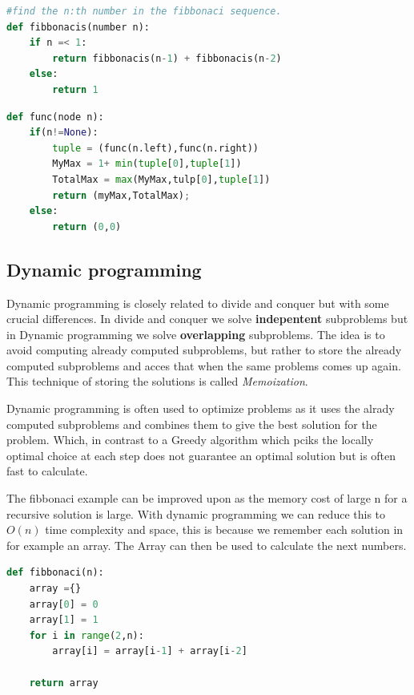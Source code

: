 \documentclass[12pt]{article} %
\begin{document}
\begin{lstlisting}[language=Python, caption=Fibbonaci in Python]
#find the n:th number in the fibbonaci sequence.
def fibbonacis(number n):
    if n =< 1:
        return fibbonacis(n-1) + fibbonacis(n-2)
    else:
        return 1
\end{lstlisting}
\begin{lstlisting}[language=Python, caption=Perfect subtree in BST]
def func(node n):
    if(n!=None):
        tuple = (func(n.left),func(n.right))
        MyMax = 1+ min(tuple[0],tuple[1])
        TotalMax = max(MyMax,tulp[0],tuple[1])
        return (myMax,TotalMax);
    else:
        return (0,0)
\end{lstlisting}

\subsection{Dynamic programming} %
Dynamic programming is closely related to divide and conquer but with some crucial differences. In divide and conquer we solve \textbf{indepentent} subproblems but in Dynamic programming we solve \textbf{overlapping} subproblems. The idea is to avoid computing already computed subproblems, but rather to store the already computed subproblems and acces that when the same problems comes up again. This technique of storing the solutions is called \textit{Memoization}.

\par Dynamic programming is often used to optimize problems as it uses the alrady computed subproblems and combines them to give the best solution for the problem. Which, in contrast to a Greedy algorithm which pciks the locally optimal choice at each step does not guarantee an optimal solution but is often fast to calculate.

\par The fibbonaci example can be improved upon as the memory cost of large n for a recursive solution is large. With dynamic programming we can reduce this to $O(n)$ time complexity and space, this is because we remember each solution in for example an array. The Array can then be used to calculate the next numbers.

\begin{lstlisting}[language=Python, caption=Dynamic programming Fibbonaci numbers in Python]
def fibbonaci(n):
    array ={}
    array[0] = 0
    array[1] = 1
    for i in range(2,n):
        array[i] = array[i-1] + array[i-2]

    return array
\end{lstlisting}
\end{document}
